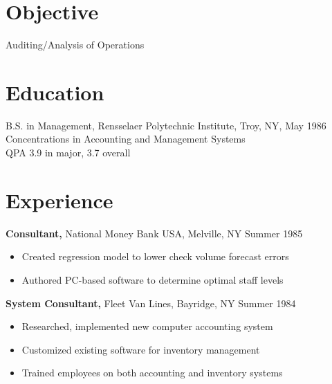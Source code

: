 \documentclass[margin]{res}
\begin{document}
 
 


 
\begin{resume} 

\section{Objective} 
Auditing/Analysis of Operations 

\section{Education} 
B.S. in Management, Rensselaer Polytechnic Institute, Troy, NY, May 1986 \\
Concentrations in Accounting and Management Systems \\
QPA 3.9 in major, 3.7 overall
 

\section{Experience}
 {\bf Consultant,} National Money Bank USA, Melville, NY \hfill Summer  1985
 \begin{itemize} \itemsep -2pt  %
 \item Created regression model to lower check volume 
                 forecast errors
 \item Authored PC-based software to determine optimal 
                 staff levels 
 \end{itemize}

 
 
{\bf System Consultant,} Fleet Van Lines, Bayridge, NY \hfill  Summer 1984
\begin{itemize} \itemsep -2pt %
\item Researched, implemented new computer accounting 
                 system 
\item Customized existing software for inventory 
                 management 
\item Trained employees on both accounting and inventory 
                 systems 
\end{itemize}


\end{resume}
\end{document}
